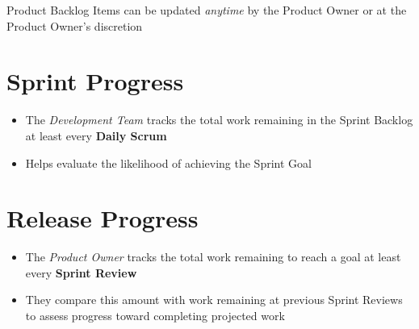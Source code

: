 \documentclass[a4paper,11pt,twocolumn]{article}
\begin{document}
\begin{tcolorbox}[colback=black!8!white,colframe=gray!50!black,title=Note,sharp corners,fonttitle=\normalsize\bfseries,fontupper=\normalsize,left=0.7em,right=0.7em]
	Product Backlog Items can be updated \textit{anytime} by the Product Owner or at the Product Owner's discretion
\end{tcolorbox}

\section*{Sprint Progress}
\begin{itemize}
	\item The \textit{Development Team} tracks the total work remaining in the Sprint Backlog at least every \textbf{Daily Scrum}
	\item Helps evaluate the likelihood of achieving the Sprint Goal
\end{itemize}

\section*{Release Progress}
\begin{itemize}
	\item The \textit{Product Owner} tracks the total work remaining to reach a goal at least every \textbf{Sprint Review}
	\item They compare this amount with work remaining at previous Sprint Reviews to assess progress toward completing projected work
\end{itemize}

\nocite{*}


\end{document}
